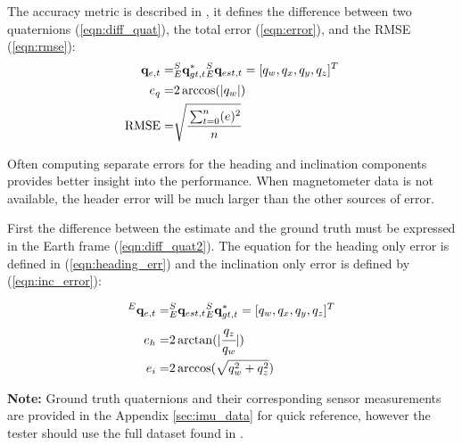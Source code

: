 \documentclass[12pt, titlepage]{article}
\begin{document}
The accuracy metric is described in \cite{broad}, it defines the difference between two quaternions
(\ref{eqn:diff_quat}), the total error (\ref{eqn:error}), and the RMSE (\ref{eqn:rmse}):
\begin{align}
    \mathbf{q}_{e, t} =& {}^S_E\mathbf{q}^{*}_{gt, t}  {}^S_E\mathbf{q}_{est, t} = [q_w, q_x, q_y, q_z]^T \label{eqn:diff_quat} \\
    e_q =& 2 \arccos(|q_w|)  \label{eqn:error}\\
    \text{RMSE} =& \sqrt{\cfrac{\sum_{t=0}^n(e)^2}{n}}  \label{eqn:rmse}
\end{align}

Often computing separate errors for the heading and inclination components provides better insight
into the performance. When magnetometer data is not available, the header error will be much larger
than the other sources of error.

First the difference between the estimate and the ground truth must be expressed in the Earth frame
(\ref{eqn:diff_quat2}). The equation for the heading only error is defined in
(\ref{eqn:heading_err}) and the inclination only error is defined by (\ref{eqn:inc_error}):

\begin{align}
    {}^E \mathbf{q}_{e,t} =& {}^S_E\mathbf{q}_{est, t} {}^S_E\mathbf{q}^{*}_{gt, t} = [q_w, q_x, q_y, q_z]^T \label{eqn:diff_quat2} \\
    e_{h} =& 2 \arctan(|\cfrac{q_z}{q_w}|) \label{eqn:heading_err} \\
    e_{i} =&  2 \arccos(\sqrt{q_w^2 + q_z^2}) \label{eqn:inc_error}
\end{align}

\textbf{Note:} Ground truth quaternions and their corresponding sensor measurements are provided in
the Appendix \ref{sec:imu_data} for quick reference, however the tester should use the full dataset
found in \citep{broad_code}.
\end{document}
